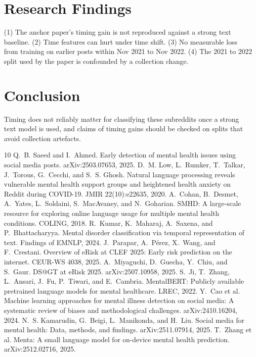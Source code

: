 \documentclass[10pt,twocolumn]{article}
\begin{document}
\section{Research Findings}
(1) The anchor paper's timing gain is not reproduced against a strong text baseline. (2) Time features can hurt under time shift. (3) No measurable loss from training on earlier posts within Nov 2021 to Nov 2022. (4) The 2021 to 2022 split used by the paper is confounded by a collection change.

\section{Conclusion}
Timing does not reliably matter for classifying these subreddits once a strong text model is used, and claims of timing gains should be checked on splits that avoid collection artefacts.

\begin{thebibliography}{10}
 Q.~B. Saeed and I.~Ahmed. Early detection of mental health issues using social media posts. arXiv:2503.07653, 2025.
 D.~M. Low, L.~Rumker, T.~Talkar, J.~Torous, G.~Cecchi, and S.~S. Ghosh. Natural language processing reveals vulnerable mental health support groups and heightened health anxiety on Reddit during COVID-19. JMIR 22(10):e22635, 2020.
 A.~Cohan, B.~Desmet, A.~Yates, L.~Soldaini, S.~MacAvaney, and N.~Goharian. SMHD: A large-scale resource for exploring online language usage for multiple mental health conditions. COLING, 2018.
 R.~Kumar, K.~Maharaj, A.~Saxena, and P.~Bhattacharyya. Mental disorder classification via temporal representation of text. Findings of EMNLP, 2024.
 J.~Parapar, A.~P\'erez, X.~Wang, and F.~Crestani. Overview of eRisk at CLEF 2025: Early risk prediction on the internet. CEUR-WS 4038, 2025.
 A.~Miyaguchi, D.~Guecha, Y.~Chiu, and S.~Gaur. DS@GT at eRisk 2025. arXiv:2507.10958, 2025.
 S.~Ji, T.~Zhang, L.~Ansari, J.~Fu, P.~Tiwari, and E.~Cambria. MentalBERT: Publicly available pretrained language models for mental healthcare. LREC, 2022.
 Y.~Cao et al. Machine learning approaches for mental illness detection on social media: A systematic review of biases and methodological challenges. arXiv:2410.16204, 2024.
 N.~S. Kamarudin, G.~Beigi, L.~Manikonda, and H.~Liu. Social media for mental health: Data, methods, and findings. arXiv:2511.07914, 2025.
 T.~Zhang et al. Menta: A small language model for on-device mental health prediction. arXiv:2512.02716, 2025.
\end{thebibliography}
\end{document}

